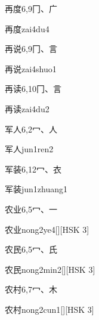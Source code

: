 \begin{entry}{再度}{6,9}{⼌、⼴}
  \begin{phonetics}{再度}{zai4du4}
  \end{phonetics}
\end{entry}

\begin{entry}{再说}{6,9}{⼌、⾔}
  \begin{phonetics}{再说}{zai4shuo1}
  \end{phonetics}
\end{entry}

\begin{entry}{再读}{6,10}{⼌、⾔}
  \begin{phonetics}{再读}{zai4du2}
  \end{phonetics}
\end{entry}

\begin{entry}{军人}{6,2}{⼍、⼈}
  \begin{phonetics}{军人}{jun1ren2}
  \end{phonetics}
\end{entry}

\begin{entry}{军装}{6,12}{⼍、⾐}
  \begin{phonetics}{军装}{jun1zhuang1}
  \end{phonetics}
\end{entry}

\begin{entry}{农业}{6,5}{⼍、⼀}
  \begin{phonetics}{农业}{nong2ye4}[][HSK 3]
  \end{phonetics}
\end{entry}

\begin{entry}{农民}{6,5}{⼍、⽒}
  \begin{phonetics}{农民}{nong2min2}[][HSK 3]
  \end{phonetics}
\end{entry}

\begin{entry}{农村}{6,7}{⼍、⽊}
  \begin{phonetics}{农村}{nong2cun1}[][HSK 3]
  \end{phonetics}
\end{entry}

